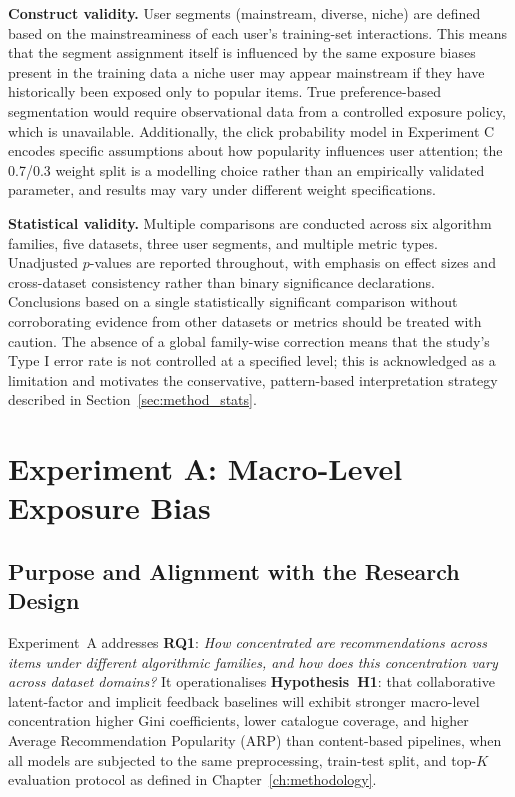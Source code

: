 \documentclass[11pt,a4paper]{report}
\begin{document}
\textbf{Construct validity.} User segments (mainstream, diverse, niche) are defined based on the mainstreaminess of each user's training-set interactions. This means that the segment assignment itself is influenced by the same exposure biases present in the training data a niche user may appear mainstream if they have historically been exposed only to popular items. True preference-based segmentation would require observational data from a controlled exposure policy, which is unavailable. Additionally, the click probability model in Experiment C encodes specific assumptions about how popularity influences user attention; the 0.7/0.3 weight split is a modelling choice rather than an empirically validated parameter, and results may vary under different weight specifications.

\textbf{Statistical validity.} Multiple comparisons are conducted across six algorithm families, five datasets, three user segments, and multiple metric types. Unadjusted $p$-values are reported throughout, with emphasis on effect sizes and cross-dataset consistency rather than binary significance declarations. Conclusions based on a single statistically significant comparison without corroborating evidence from other datasets or metrics should be treated with caution. The absence of a global family-wise correction means that the study's Type I error rate is not controlled at a specified level; this is acknowledged as a limitation and motivates the conservative, pattern-based interpretation strategy described in Section~\ref{sec:method_stats}.



\chapter{Experiment A: Macro-Level Exposure Bias}
\label{ch:exp_a}

\section{Purpose and Alignment with the Research Design}
\label{sec:expa_purpose}

Experiment~A addresses \textbf{RQ1}: \emph{How concentrated are recommendations across items under different algorithmic families, and how does this concentration vary across dataset domains?} It operationalises \textbf{Hypothesis~H1}: that collaborative latent-factor and implicit feedback baselines will exhibit stronger macro-level concentration higher Gini coefficients, lower catalogue coverage, and higher Average Recommendation Popularity (ARP) than content-based pipelines, when all models are subjected to the same preprocessing, train-test split, and top-$K$ evaluation protocol as defined in Chapter~\ref{ch:methodology}.
\end{document}
